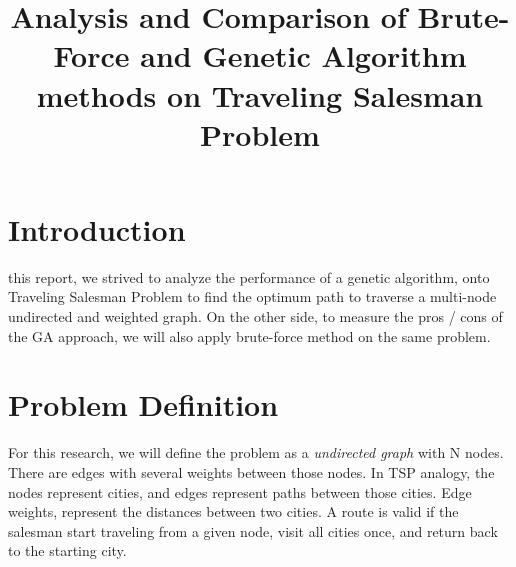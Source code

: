 \documentclass[journal,transmag]{IEEEtran}
\begin{document}
    \title{
        Analysis and Comparison of Brute-Force and Genetic Algorithm methods
        on Traveling Salesman Problem
    }

    \author{
    }



    \maketitle
    \IEEEdisplaynontitleabstractindextext
    \IEEEpeerreviewmaketitle

    \section{Introduction}

     this report, we strived to analyze the performance of a genetic algorithm,
    onto Traveling Salesman Problem to find the optimum path to traverse a multi-node undirected and
    weighted graph. On the other side, to measure the pros / cons of the GA approach, we will also apply
    brute-force method on the same problem.

    \section{Problem Definition}

    For this research, we will define the problem as a \textit{undirected graph} with N nodes.
    There are edges with several weights between those nodes. In TSP analogy, the nodes represent
    cities, and edges represent paths between those cities. Edge weights, represent the distances
    between two cities. A route is valid if the salesman start traveling from a given node, visit
    all cities once, and return back to the starting city.
\end{document}
